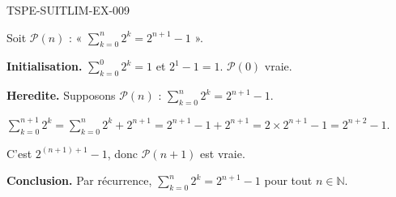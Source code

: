 \begin{corrige}{TSPE-SUITLIM-EX-009}


Soit $\mathcal{P}(n)$ : « $\displaystyle\sum_{k=0}^{n} 2^k = 2^{n+1} - 1$ ».

\textbf{Initialisation.} $\sum_{k=0}^{0} 2^k = 1$ et $2^1 - 1 = 1$. $\mathcal{P}(0)$ vraie.

\textbf{Heredite.} Supposons $\mathcal{P}(n)$ : $\sum_{k=0}^{n} 2^k = 2^{n+1} - 1$.

$\sum_{k=0}^{n+1} 2^k = \sum_{k=0}^{n} 2^k + 2^{n+1} = 2^{n+1} - 1 + 2^{n+1} = 2 \times 2^{n+1} - 1 = 2^{n+2} - 1$.

C'est $2^{(n+1)+1} - 1$, donc $\mathcal{P}(n+1)$ est vraie.

\textbf{Conclusion.} Par récurrence, $\boxed{\sum_{k=0}^{n} 2^k = 2^{n+1} - 1}$ pour tout $n \in \mathbb{N}$.

\end{corrige}
